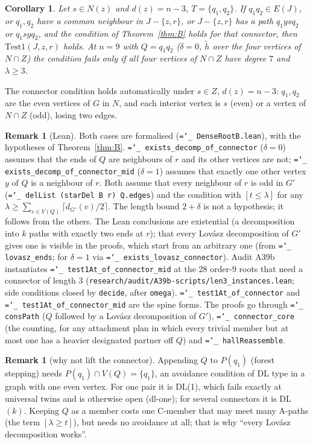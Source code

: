 \documentclass[11pt]{amsart}
\newtheorem{corollary}[theorem]{Corollary}
\theoremstyle{definition}
\newtheorem{remark}[theorem]{Remark}
\newcommand{\lean}[1]{\texttt{\hyphenchar\font=`\_ #1}}
\begin{document}
\begin{corollary}\label{cor:B}
Let $s\in N(z)$ and $d(z)=n-3$, $T=\{q_1,q_2\}$. If $q_1q_2\in E(J)$, or $q_1,q_2$ have a common
neighbour in $J-\{z,r\}$, or $J-\{z,r\}$ has a path $q_1ysq_2$ or $q_1syq_2$, and the condition of Theorem~\ref{thm:B} holds for that connector, then
$\mathrm{Test1}(J,z,r)$ holds. At $n=9$ with $Q=q_1q_2$ ($\delta=0$, $\tilde h$ over the four vertices of
$N\cap Z$) the condition fails only if all four vertices of $N\cap Z$ have degree $7$ and $\lambda\ge3$.
\end{corollary}

The connector condition holds automatically under $s\in Z$, $d(z)=n-3$: $q_1,q_2$ are the even vertices
of $G$ in $N$, and each interior vertex is $s$ (even) or a vertex of $N\cap Z$ (odd), losing two edges.

\begin{remark}[Lean]
Both cases are formalised (\lean{DenseRootB.lean}), with the hypotheses of Theorem~\ref{thm:B}.
\lean{exists\_decomp\_of\_connector} ($\delta=0$) assumes that the ends of $Q$ are neighbours of $r$
and its other vertices are not; \lean{exists\_decomp\_of\_connector\_mid} ($\delta=1$) assumes that
exactly one other vertex $y$ of $Q$ is a neighbour of $r$. Both assume that every neighbour of $r$ is
odd in $G'$ (\lean{delList (starDel B r) Q.edges}) and the condition with $[t\le\lambda]$ for any
$\lambda\ge\sum_{v\in V(Q)}\lceil d_{G'}(v)/2\rceil$. The length bound $2+\delta$ is not a hypothesis;
it follows from the others. The Lean conclusions are existential (a decomposition into $k$ paths with
exactly two ends at $r$); that every Lov\'asz decomposition of $G'$ gives one is visible in the proofs,
which start from an arbitrary one (from \lean{lovasz\_ends}; for $\delta=1$ via
\lean{exists\_lovasz\_connector}). Audit A39b instantiates
\lean{test1At\_of\_connector\_mid} at the $28$ order-$9$ roots that need a connector of length $3$
(\texttt{research/audit/A39b-scripts/len3\_instances.lean}; side conditions closed by \texttt{decide}, after \texttt{omega}). \lean{test1At\_of\_connector} and \lean{test1At\_of\_connector\_mid} are the spine forms. The
proofs go through \lean{consPath} ($Q$ followed by a Lov\'asz decomposition of $G'$),
\lean{connector\_core} (the counting, for any attachment plan in which every trivial member but at
most one has a heavier designated partner off $Q$) and \lean{hallReassemble}.
\end{remark}

\begin{remark}[why not lift the connector]
Appending $Q$ to $P(q_1)$ (forest stepping) needs $P(q_1)\cap V(Q)=\{q_1\}$, an avoidance condition
of DL type in a graph with one even vertex. For one pair it is DL(1), which fails exactly at universal
twins and is otherwise open (dl-one); for several connectors it is DL$(k)$. Keeping $Q$ as a member costs one C-member that may meet many A-paths (the term
$[\lambda\ge t]$), but needs no avoidance at all; that is why ``every Lov\'asz decomposition works''.
\end{remark}
\end{document}
